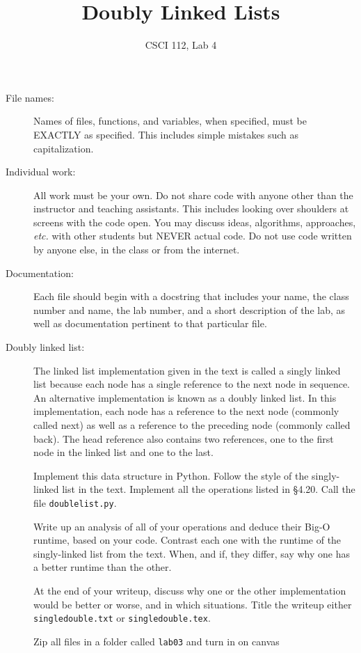 \documentclass{article}
\title{Doubly Linked Lists}
\author{CSCI 112, Lab 4}
\date{}
\begin{document}
\sloppy

\maketitle

\begin{description} 
\item[File names:]  Names of files, functions, and variables, 
when specified,
must be EXACTLY as specified.  This includes simple mistakes such
as capitalization.

\item[Individual work:]  All work must be your own.  Do not share
code with anyone other than the instructor and teaching assistants.
This includes looking over shoulders at screens with the code open.
You may discuss ideas, algorithms, approaches, {\em etc.} with
other students but NEVER actual code.  Do not use code
written by anyone else, in the class or from the internet.

\item[Documentation:] Each file should begin with a docstring
that includes your name, the class number and name, the lab
number, and  
a short description of the lab, as well as documentation pertinent
to that particular file.

\item[Doubly linked list:] 
The linked list implementation given in the text is called a singly linked list 
because each node has a single reference to the next node in sequence. 
An alternative implementation is known as a doubly linked list. 
In this implementation, each node has a reference to the next node 
(commonly called next) as well as a reference to the preceding node 
(commonly called back). The head reference also contains two references,
 one to the first node in the linked list and one to the last.
 
 Implement this data structure in Python.  Follow the style of the
 singly-linked list in the text.  Implement all the operations 
listed in \S 4.20.  Call the file \lstinline{doublelist.py}.

Write up an analysis of all of your operations and deduce their
Big-O runtime, based on your code.  Contrast each one with
the runtime of the singly-linked list from the text.  When, and if,
they differ, say why one has a better runtime than the other.

At the end of your writeup, discuss why one or the other 
implementation would be better or worse, and in which situations.
Title the writeup either {\tt singledouble.txt} or {\tt singledouble.tex}.

Zip all files in a folder called {\tt lab03} and turn in on canvas

\end{description}
\end{document}
